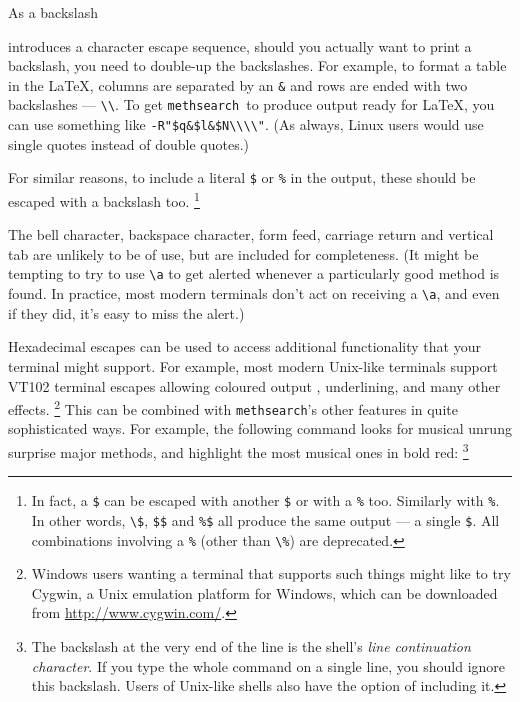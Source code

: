\documentclass[a4paper,11pt,oneside]{book}
\makeatletter
\newcommand{\symidx}[2]{} %
\def\methsearch{\texttt{meth\-search}}
\makeatother
\begin{document}
As a backslash%
\symidx{\textbackslash}{character escape sequence} 
introduces a character escape sequence, 
should you actually want to print a backslash, you need to double-up the 
backslashes.  For example, to format a table in the \LaTeX{}, 
columns are separated by an \verb+&+ and rows are ended with two backslashes 
--- \verb+\\+.  
To get \methsearch\ to produce output ready for \LaTeX, you can use
something like \verb+-R"$q&$l&$N\\\\"+.  (As always, Linux users would use
single quotes instead of double quotes.)

For similar reasons, to include a literal \verb+$+ or \verb+%+ in the 
output, these should be escaped with a backslash too.%
\footnote{In fact, a \verb+$+ can be escaped with another \verb+$+ or 
with a \verb+%+ too.  Similarly with \verb+%+.  In other words, \verb+\$+,
\verb+$$+ and \verb+%$+ all produce the same output --- a single \verb+$+.
All combinations involving a \verb+%+ (other than \verb+\%+) are deprecated.}

The bell character, backspace character, 
form feed, carriage return and vertical tab are unlikely to be
of use, but are included for completeness.  (It might be tempting to try to 
use \verb+\a+ to get alerted whenever a particularly good method is found.
In practice, most modern terminals don't act on receiving a \verb+\a+, and
even if they did, it's easy to miss the alert.)

Hexadecimal escapes can be used to access additional functionality that
your terminal might support.  For example, most modern Unix-like terminals
support VT102 terminal escapes allowing coloured output%
, underlining, and many other effects.%
\footnote{Windows users wanting a terminal that supports such things
might like to try Cygwin, a Unix emulation platform for Windows, 
which can be downloaded from \url{http://www.cygwin.com/}.}
This can be combined with \methsearch's other features in quite sophisticated
ways.  For example, the following command looks for musical unrung 
surprise major methods, and highlight the most musical ones in bold red:%
%
\footnote{The backslash at the very end of the line is the shell's 
\textit{line continuation character}.  If you 
type the whole command on a single line, you should ignore this backslash.
Users of Unix-like shells also have the option of including it.}
\end{document}
